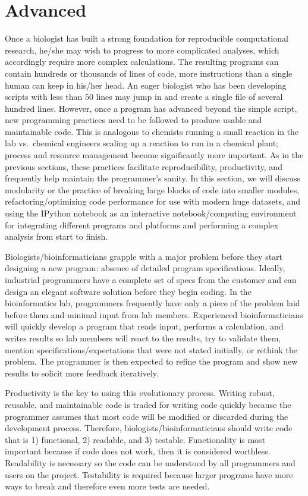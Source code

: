 \documentclass[ChapterTOCs,krantz2]{krantz} %
\begin{document}
\section{Advanced}

Once a biologist has built a strong foundation for reproducible computational
research, he/she may wish to progress to more complicated analyses, which
accordingly require more complex calculations.  The resulting programs can
contain hundreds or thousands of lines of code, more instructions than a single
human can keep in his/her head.  An eager biologist who has been developing 
scripts with less than 50 lines may jump in and create a single file of
several hundred lines.  However, once a program has advanced beyond the
simple script, new programming practices need to be followed to produce usable
and maintainable code.  This is analogous to chemists running a small reaction
in the lab vs.\ chemical engineers scaling up a reaction to run in a chemical
plant; process and resource management become significantly more important.  As in the
previous sections, these practices facilitate reproducibility,
productivity, and frequently help maintain the programmer's sanity.  In this
section, we will discuss modularity or the practice of breaking large blocks of
code into smaller modules, refactoring/optimizing code performance for use with
modern huge datasets, and using the IPython notebook as an interactive
notebook/computing environment for integrating different programs and platforms
and performing a complex analysis from start to finish.

Biologists/bioinformaticians grapple with a major problem before they start 
designing a new program:
absence of detailed program specifications\cite{Segal2007}.  Ideally, industrial
programmers have a complete set of specs from the customer 
and can design an elegant software solution before they begin
coding.  In the bioinformatics lab, programmers frequently have only a piece of
the problem laid before them and minimal input from lab members.  
Experienced bioinformaticians will quickly
develop a program that reads input, performs a calculation, and writes
results so lab members will react to the results, try to validate them, mention
specifications/expectations that were not stated initially, or
rethink the problem.  The programmer is then
expected to refine the program and show new results to
solicit more feedback iteratively. 

Productivity is the key to using this evolutionary process.  
Writing robust, reusable, and maintainable code is traded for
writing code quickly because the programmer assumes that most code will be
modified or discarded during the development process.  Therefore,
biologists/bioinformaticians should write code that is 1) functional, 2)
readable, and 3) testable.  Functionality is most important because if code
does not work, then it is considered worthless\cite{Kelly2008}.
Readability is necessary so the code can be understood by all programmers and users
on the project.  
Testability is required
because larger programs have more ways to break and therefore even more tests
are needed.
\end{document}

